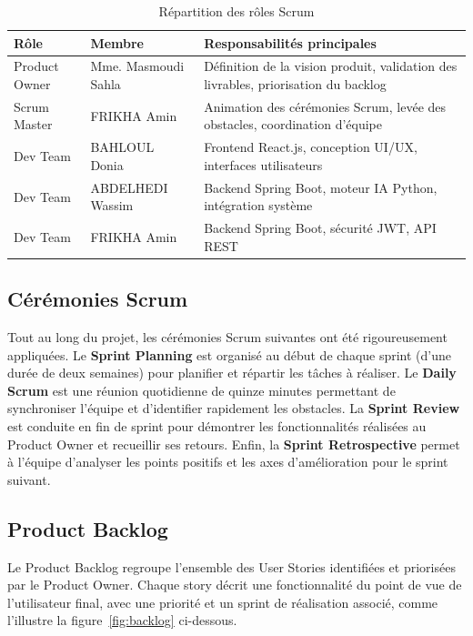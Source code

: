 \documentclass[12pt,a4paper]{report}
\begin{document}
\begin{table}[H]
\centering
\caption{Répartition des rôles Scrum}
\label{tab:scrum_roles}
\begin{tabular}{|l|l|p{6cm}|}
\hline
\textbf{Rôle} & \textbf{Membre} & \textbf{Responsabilités principales} \\
\hline
Product Owner & Mme. Masmoudi Sahla & Définition de la vision produit, validation des livrables, priorisation du backlog \\
\hline
Scrum Master & FRIKHA Amin & Animation des cérémonies Scrum, levée des obstacles, coordination d'équipe \\
\hline
Dev Team & BAHLOUL Donia & Frontend React.js, conception UI/UX, interfaces utilisateurs \\
\hline
Dev Team & ABDELHEDI Wassim & Backend Spring Boot, moteur IA Python, intégration système \\
\hline
Dev Team & FRIKHA Amin & Backend Spring Boot, sécurité JWT, API REST \\
\hline
\end{tabular}
\end{table}

\subsection{Cérémonies Scrum}

Tout au long du projet, les cérémonies Scrum suivantes ont été rigoureusement appliquées. Le \textbf{Sprint Planning} est organisé au début de chaque sprint (d'une durée de deux semaines) pour planifier et répartir les tâches à réaliser. Le \textbf{Daily Scrum} est une réunion quotidienne de quinze minutes permettant de synchroniser l'équipe et d'identifier rapidement les obstacles. La \textbf{Sprint Review} est conduite en fin de sprint pour démontrer les fonctionnalités réalisées au Product Owner et recueillir ses retours. Enfin, la \textbf{Sprint Retrospective} permet à l'équipe d'analyser les points positifs et les axes d'amélioration pour le sprint suivant.

\subsection{Product Backlog}

Le Product Backlog regroupe l'ensemble des User Stories identifiées et priorisées par le Product Owner. Chaque story décrit une fonctionnalité du point de vue de l'utilisateur final, avec une priorité et un sprint de réalisation associé, comme l'illustre la figure~\ref{fig:backlog} ci-dessous.
\end{document}
